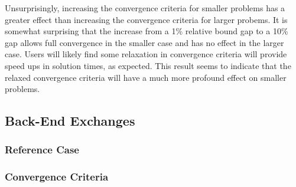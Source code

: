 Unsurprisingly, increasing the convergence criteria for smaller problems has a
greater effect than increasing the convergence criteria for larger probems. It
is somewhat surprising that the increase from a 1\% relative bound gap to a 10\%
gap allows full convergence in the smaller case and has no effect in the larger
case. Users will likely find some relaxation in convergence criteria will
provide speed ups in solution times, as expected. This result seems to indicate
that the relaxed convergence criteria will have a much more profound effect on
smaller problems.

\subsection{Back-End Exchanges}

\subsubsection{Reference Case}






\subsubsection{Convergence Criteria}
